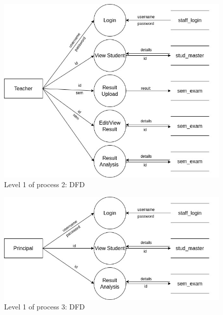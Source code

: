 \documentclass{nascproject}
\begin{document}
\begin{figure}
	\centering
	\includegraphics[width=1\linewidth]{level_teacher.jpg}
	\caption{Level 1 of process 2: DFD}
	\label{level_teacher}
\end{figure}
\begin{figure}
	\centering
	\includegraphics[width=1\linewidth]{level_p.jpg}
	\caption{Level 1 of process 3: DFD}
	\label{level_prin}
\end{figure}
\end{document}
